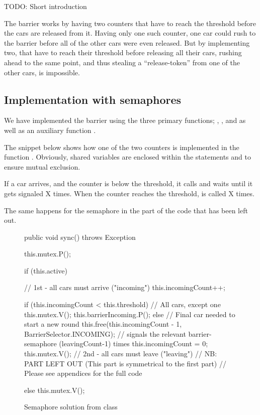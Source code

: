 
TODO: Short introduction

The barrier works by having two counters that have to reach the
threshold before the cars are released from it. Having only one such
counter, one car could rush to the barrier before all of the other
cars were even released. But by implementing two, that have to reach
their threshold before releasing all their cars, rushing ahead to the
same point, and thus stealing a ``release-token'' from one of the
other cars, is impossible.


\subsection{Implementation with semaphores}
\label{sub:bar-sema}
We have implemented the barrier using the three primary functions;
, , and  as well as an auxiliary
function .

The snippet below shows how one of the two counters is implemented in
the function . Obviously, shared variables are enclosed
within the statements  and  to ensure
mutual exclusion.

If a car arrives, and the counter is below the threshold, it calls
 and waits until it gets signaled X
times. When the counter reaches the threshold,
 is called X times.

The same happens for the semaphore  in the part
of the code that has been left out.

\begin{figure}[H]
\label{lst:bar-sema}
\begin{java}
public void sync() throws Exception {
	this.mutex.P();

	if (this.active) {
		// 1st - all cars must arrive ("incoming")
		this.incomingCount++;

		if (this.incomingCount < this.threshold) { // All cars, except one
			this.mutex.V();
			this.barrierIncoming.P();
		} else { // Final car needed to start a new round
			this.free(this.incomingCount - 1, BarrierSelector.INCOMING);
			// signals the relevant barrier-semaphore (leavingCount-1) times
			this.incomingCount = 0;
			this.mutex.V();
		}
		// 2nd - all cars must leave ("leaving")
		// NB: PART LEFT OUT (This part is symmetrical to the first part)
		// Please see appendices for the full code

	} else {
		this.mutex.V();
	}
}
\end{java}
\caption{Semaphore solution from  class}
\end{figure}


